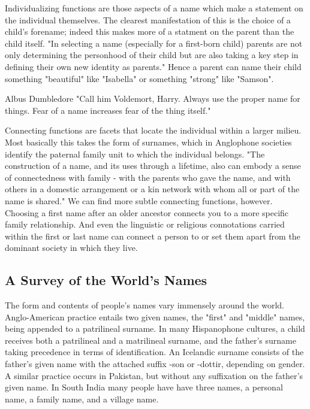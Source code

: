 Individualizing functions are those aspects of a name which make a statement on
the individual themselves. The clearest manifestation of this is the choice of a
child's forename; indeed this makes more of a statment on the parent than the
child itself. "In selecting a name (especially for a first-born child) parents
are not only determining the personhood of their child but are also taking a key
step in defining their own new identity as parents." \parencite[718]{finch08}
Hence a parent can name their child something "beautiful" like "Isabella" or
something "strong" like "Samson".

\begin{aquote}{Albus Dumbledore}
"Call him Voldemort, Harry. Always use the proper name for things. Fear of a
name increases fear of the thing itself." \parencite{rowling97}
\end{aquote}

Connecting functions are facets that locate the individual within a larger
milieu. Most basically this takes the form of surnames, which in Anglophone
societies identify the paternal family unit to which the individual belongs.
"The construction of a name, and its uses through a lifetime, also can embody a
sense of connectedness with family - with the parents who gave the name, and
with others in a domestic arrangement or a kin network with whom all or part of
the name is shared." \parencite[711]{finch08} We can find more subtle connecting
functions, however. Choosing a first name after an older ancestor connects you
to a more specific family relationship. And even the linguistic or religious
connotations carried within the first or last name can connect a person to or
set them apart from the dominant society in which they live.

\subsection{A Survey of the World's Names}

The form and contents of people's names vary immensely around the world.
Anglo-American practice entails two given names, the "first" and "middle" names,
being appended to a patrilineal surname. In many Hispanophone cultures, a child
receives both a patrilineal and a matrilineal surname, and the father's surname
taking precedence in terms of identification. An Icelandic surname consists of
the father's given name with the attached suffix -son or -dottir, depending on
gender. A similar practice occurs in Pakistan, but without any suffixation on
the father's given name. In South India many people have have three names, a
personal name, a family name, and a village name.

